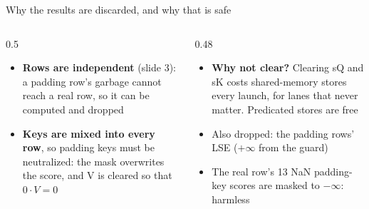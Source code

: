 \documentclass[aspectratio=169,11pt]{beamer}
\newcommand{\NaN}{NaN}
\begin{document}
\begin{frame}{Why the results are discarded, and why that is safe}
\centering
{}
\vspace{3mm}
\begin{columns}[T]
\begin{column}{0.5\textwidth}
\small
\begin{itemize}
\item \textbf{Rows are independent} (slide 3): a padding row's garbage cannot reach a real row, so it can be computed and dropped
\item \textbf{Keys are mixed into every row}, so padding keys must be neutralized: the mask overwrites the score, and V is cleared so that $0\cdot V=0$
\end{itemize}
\end{column}
\begin{column}{0.48\textwidth}
\small
\begin{itemize}
\item \textbf{Why not clear?} Clearing sQ and sK costs shared-memory stores every launch, for lanes that never matter. Predicated stores are free
\item Also dropped: the padding rows' LSE ($+\infty$ from the guard)
\item The real row's 13 \NaN{} padding-key scores are masked to $-\infty$: harmless
\end{itemize}
\end{column}
\end{columns}
\end{frame}
\end{document}
